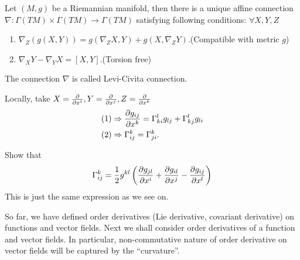 \begin{theorem}
    Let \((M,g)\) be a Riemannian manifold, then there is a unique
    affine connection 
    \(\nabla\colon \Gamma(TM)\times \Gamma (TM)\to \Gamma(TM)\)
    satisfying following conditions: \(\forall X,Y,Z\)
    \begin{enumerate}[(1)]
        \item \(\nabla_Z \left(g(X,Y)\right)=g\left(
            \nabla_Z X,Y\right)+g(X,\nabla_Z Y)\).(Compatible with metric 
            \(g\))\footnotemark
        \item \(\nabla_X Y-\nabla_Y X=[X,Y]\).(Torsion free)
    \end{enumerate}
    The connection \(\nabla\) is called Levi-Civita connection.
\end{theorem}
Locally, take \(X=\pdv{x^i},Y=\pdv{x^j},Z=\pdv{x^k}\)
\begin{align*}
    (1)&\Rightarrow \pdv{g_{ij}}{x^k}=\Gamma\indices*{_{ki}^l}g_{lj}
    +\Gamma\indices*{_{kj}^l}g_{l i}    \\
    (2)&\Rightarrow \Gamma\indices*{_{ij}^k}=\Gamma\indices*{_{ji}^k}.
\end{align*}
\begin{exercise}
    Show that 
    \[
        \Gamma\indices*{_{ij}^k}=\frac{1}{2}g^{kl}\left(
            \pdv{g_{jl}}{x^i}+\pdv{g_{il}}{x^j}-\pdv{g_{ij}}{x^l}
        \right)    
    \]
    This is just the same expression as we see on.
\end{exercise}
So far, we have defined  order derivatives (Lie derivative,
covariant derivative) on functions and vector fields. Next we shall consider
 order derivatives of a function and vector fields.
In particular, non-commutative nature of  order derivative
on vector fields will be captured by the ``curvature''.
    
